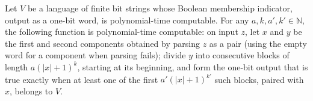 \begin{theorem}
\label{Complexity.polyTimeComputable_blockAnyTest}
\leanok
{}
Let $V$ be a language of finite bit strings whose Boolean membership indicator, output
as a one-bit word, is polynomial-time computable. For any $a,k,a',k'\in\mathbb{N}$, the
following function is polynomial-time computable: on input $z$, let $x$ and $y$ be the
first and second components obtained by parsing $z$ as a pair (using the empty word for
a component when parsing fails); divide $y$ into consecutive blocks of length
$a(|x|+1)^k$, starting at its beginning, and form the one-bit output that is true
exactly when at least one of the first $a'(|x|+1)^{k'}$ such blocks, paired with $x$,
belongs to $V$.
\end{theorem}
